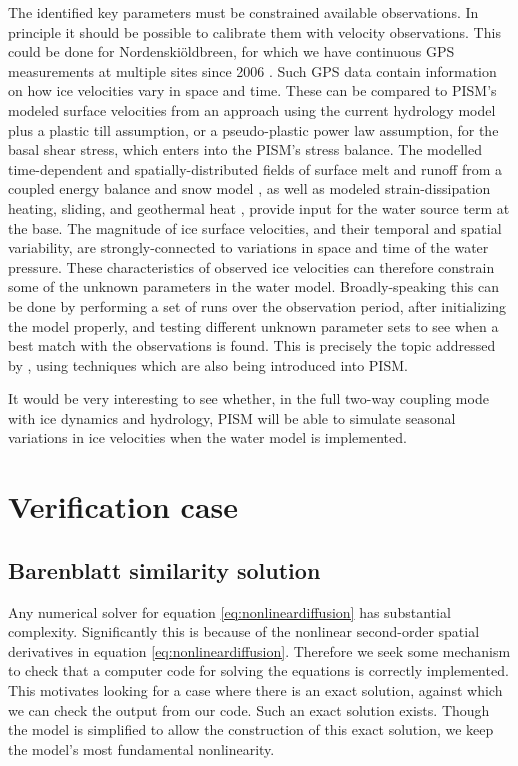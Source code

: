 \documentclass[11pt]{amsart}
\begin{document}
The identified key parameters must be constrained available observations.  In principle it should be possible to calibrate them with velocity observations.  This could be done for Nordenski\"oldbreen, for which we have continuous GPS measurements at multiple sites since 2006 \citep{denOuden2010}.   Such GPS data contain information on how ice velocities vary in space and time.  These can be compared to PISM's modeled surface velocities from an approach using the current hydrology model plus a plastic till assumption, or a pseudo-plastic power law assumption, for the basal shear stress, which enters into the PISM's stress balance.  The modelled time-dependent and spatially-distributed fields of surface melt and runoff from a coupled energy balance and snow model \citep{vanPeltetal}, as well as modeled strain-dissipation heating, sliding, and geothermal heat \citep{AschwandenBuelerKhroulevBlatter}, provide input for the water source term at the base.  The magnitude of ice surface velocities, and their temporal and spatial variability, are strongly-connected to variations in space and time of the water pressure.  These characteristics of observed ice velocities can therefore constrain some of the unknown parameters in the water model.  Broadly-speaking this can be done by performing a set of runs over the observation period, after initializing the model properly, and testing different unknown parameter sets to see when a best match with the observations is found.  This is precisely the topic addressed by \citet{Habermannetal2012}, using techniques which are also being introduced into PISM.

It would be very interesting to see whether, in the full two-way coupling mode with ice dynamics and hydrology, PISM will be able to simulate seasonal variations in ice velocities when the water model is implemented.


\section{Verification case}  \label{sec:verif}

\subsection*{Barenblatt similarity solution}  Any numerical solver for equation \eqref{eq:nonlineardiffusion} has substantial complexity.  Significantly this is because of the nonlinear second-order spatial derivatives in equation \eqref{eq:nonlineardiffusion}.  Therefore we seek some mechanism to check that a computer code for solving the equations is correctly implemented.  This motivates looking for a case where there is an exact solution, against which we can check the output from our code.  Such an exact solution exists.  Though the model is simplified to allow the construction of this exact solution, we keep the model's most fundamental nonlinearity.
\end{document}
